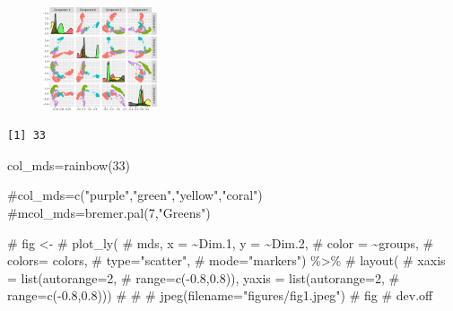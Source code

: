 \documentclass[
  letterpaper,
  DIV=11,
  numbers=noendperiod]{scrreprt}
\newenvironment{Shaded}{\begin{snugshade}}{\end{snugshade}}
\newcommand{\AttributeTok}[1]{\textcolor[rgb]{0.40,0.45,0.13}{#1}}
\newcommand{\CommentTok}[1]{\textcolor[rgb]{0.37,0.37,0.37}{#1}}
\newcommand{\DecValTok}[1]{\textcolor[rgb]{0.68,0.00,0.00}{#1}}
\newcommand{\FunctionTok}[1]{\textcolor[rgb]{0.28,0.35,0.67}{#1}}
\newcommand{\NormalTok}[1]{\textcolor[rgb]{0.00,0.23,0.31}{#1}}
\newcommand{\OtherTok}[1]{\textcolor[rgb]{0.00,0.23,0.31}{#1}}
\newcommand{\SpecialCharTok}[1]{\textcolor[rgb]{0.37,0.37,0.37}{#1}}
\begin{document}
\begin{figure}[H]

{\centering \includegraphics[width=0.3\textwidth,height=\textheight]{index_files/figure-pdf/unnamed-chunk-33-1.pdf}

}

\end{figure}

\begin{Shaded}
\end{Shaded}

\begin{verbatim}
[1] 33
\end{verbatim}

\begin{Shaded}
\begin{Highlighting}[]
\NormalTok{col\_mds}\OtherTok{=}\FunctionTok{rainbow}\NormalTok{(}\DecValTok{33}\NormalTok{)}


\CommentTok{\#col\_mds=c("purple","green","yellow","coral")}
\CommentTok{\#mcol\_mds=bremer.pal(7,"Greens")}

\CommentTok{\# fig \textless{}{-} }
\CommentTok{\# plot\_ly(}
\CommentTok{\#   mds, x = \textasciitilde{}Dim.1, y = \textasciitilde{}Dim.2,}
\CommentTok{\#   color = \textasciitilde{}groups, }
\CommentTok{\#   colors= colors,}
\CommentTok{\#   type="scatter",}
\CommentTok{\#   mode="markers") \%\textgreater{}\%}
\CommentTok{\#   layout(}
\CommentTok{\#     xaxis = list(autorange=2,}
\CommentTok{\#       range=c({-}0.8,0.8)), yaxis = list(autorange=2,}
\CommentTok{\#       range=c({-}0.8,0.8)))}
\CommentTok{\# \#}
\CommentTok{\# jpeg(filename="figures/fig1.jpeg")}
\CommentTok{\# fig}
\CommentTok{\# dev.off}
\end{Highlighting}
\end{Shaded}
\end{document}

